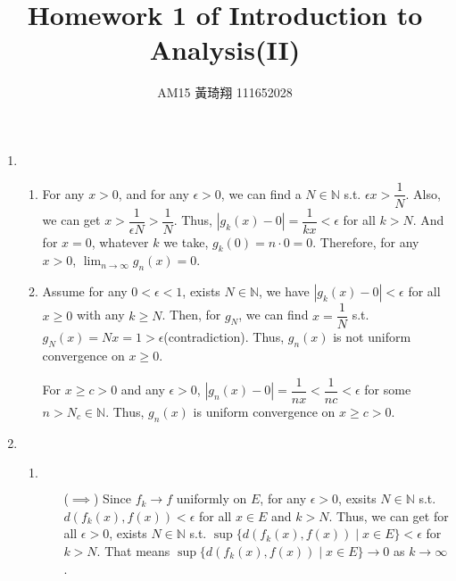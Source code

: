 \documentclass[12pt]{article}
\title{Homework 1 of Introduction to Analysis(II)}
\author{AM15 黃琦翔 111652028}
\begin{document}
\maketitle
\begin{enumerate}
    \item \begin{enumerate}
        \item For any $x > 0$, and for any $\epsilon > 0$, we can find a $N \in \mathbb{N}$ s.t. $\epsilon x > \dfrac{1}{N}$.
        Also, we can get $x > \dfrac{1}{\epsilon N} > \dfrac{1}{N}$.
        Thus, $|g_k(x) - 0| = \dfrac{1}{kx} < \epsilon$ for all $k > N$.
        And for $x = 0$, whatever $k$ we take, $g_k(0) = n \cdot 0 = 0$.
        Therefore, for any $x > 0$, $\displaystyle\lim_{n\to\infty} g_n(x) = 0$.

        \item Assume for any $0 < \epsilon < 1$, exists $N \in \mathbb{N}$,
        we have $|g_k(x) - 0| < \epsilon$ for all $x \geq 0$ with any $k \geq N$.
        Then, for $g_N$, we can find $x = \dfrac{1}{N}$ s.t. $g_N(x) = Nx = 1 > \epsilon$(contradiction).
        Thus, $g_n(x)$ is not uniform convergence on $x \geq 0$.

        For $x \geq c > 0$ and any $\epsilon > 0$, $|g_n(x) - 0| = \dfrac{1}{nx} < \dfrac{1}{nc} < \epsilon$ for some $n > N_c \in \mathbb{N}$.
        Thus, $g_n(x)$ is uniform convergence on $x \geq c > 0$.
    \end{enumerate}

    \item \begin{enumerate}
        \item $\ $ \begin{enumerate}
            \item[($\implies$)] Since $f_k \to f$ uniformly on $E$, for any $\epsilon > 0$, 
            exsits $N \in \mathbb{N}$ s.t. $d(f_k(x), f(x)) < \epsilon$ for all $x\in E$ and $k > N$.
            Thus, we can get for all $\epsilon > 0$, exists $N \in \mathbb{N}$ s.t. $\sup \{ d(f_k(x), f(x)) \mid x\in E\} < \epsilon$ for $k > N$.
            That means $\sup \{ d(f_k(x), f(x)) \mid x \in E\} \to 0$ as $k\to \infty$.
        \end{enumerate}
    \end{enumerate}
\end{enumerate}
\end{document}
